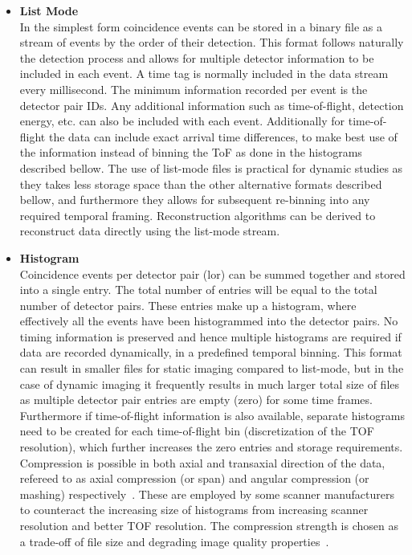 \begin{itemize}

\item\textbf{List Mode}\\
In the simplest form coincidence events can be stored in a binary file as a stream of events by the order of their detection. This format follows naturally the detection process and allows for multiple detector information to be included in each event. A time tag is normally included in the data stream every millisecond. The minimum information recorded per event is the detector pair IDs. Any additional information such as time-of-flight, detection energy, etc. can also be included with each event. Additionally for time-of-flight the data can include exact arrival time differences, to make best use of the information instead of binning the ToF as done in the histograms described bellow.
The use of list-mode files is practical for dynamic studies as they takes less storage space than the other alternative formats described bellow, and furthermore they allows for subsequent re-binning into any required temporal framing. Reconstruction algorithms can be derived to reconstruct data directly using the list-mode stream.

\item\textbf{Histogram}\\
Coincidence events per detector pair (\gls{lor}) can be summed together and stored into a single entry. The total number of entries will be equal to the total number of detector pairs. These entries make up a histogram, where effectively all the events have been histogrammed into the detector pairs. No timing information is preserved and hence multiple histograms are required if data are recorded dynamically, in a predefined temporal binning. 
This format can result in smaller files for static imaging compared to list-mode, but in the case of dynamic imaging it frequently results in much larger total size of files as multiple detector pair entries are empty (zero) for some time frames. Furthermore if time-of-flight information is also available, separate histograms need to be created for each time-of-flight bin (discretization of the TOF resolution), which further increases the zero entries and storage requirements. 
Compression is possible in both axial and transaxial direction of the data, refereed to as axial compression (or span) and angular compression (or mashing) respectively~\cite{Fahey2002}. These are employed by some scanner manufacturers to counteract the increasing size of histograms from increasing scanner resolution and better TOF resolution. The compression strength is chosen as a trade-off of file size and degrading image quality properties~\cite{Belzunce2017}. 


\end{itemize}
